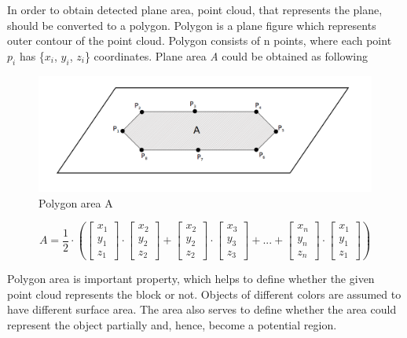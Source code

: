\documentclass{ctuthesis}
\begin{document}
In order to obtain detected plane area, point cloud, that represents the plane, should be converted to a polygon. Polygon is a plane figure which represents outer contour of the point cloud. Polygon consists of n points, where each point \emph{$p_i$} has \{$x_i$, $y_i$, $z_i$\} coordinates. Plane area \emph{A} could be obtained as following

\begin{figure}[htbp]
    \centering
    \includegraphics[width=\textwidth]{poly-area.png}
    \caption{Polygon area A}
    \label{fig:poly_area}
\end{figure}

\[ A = \frac{1}{2} \cdot ( \begin{bmatrix}
x_1\\
y_1\\
z_1
\end{bmatrix} \cdot \begin{bmatrix}
x_2\\
y_2\\
z_2
\end{bmatrix} + \begin{bmatrix}
x_2\\
y_2\\
z_2
\end{bmatrix} \cdot \begin{bmatrix}
x_3\\
y_3\\
z_3
\end{bmatrix} + ... + \begin{bmatrix}
x_n\\
y_n\\
z_n
\end{bmatrix} \cdot \begin{bmatrix}
x_1\\
y_1\\
z_1
\end{bmatrix} )  \]

Polygon area is important property, which helps to define whether the given point cloud represents the block or not. Objects of different colors are assumed to have different surface area. The area also serves to define whether the area could represent the object partially and, hence, become a potential region.
\end{document}
